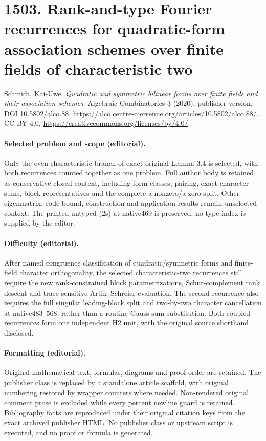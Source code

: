 \documentclass[10pt]{article}
\theoremstyle{definition}
\begin{document}
\section*{1503. Rank-and-type Fourier recurrences for quadratic-form association schemes over finite fields of characteristic two}
Schmidt, Kai-Uwe. \emph{Quadratic and symmetric bilinear forms over finite fields and their association schemes}. Algebraic Combinatorics 3 (2020), publisher version, DOI 10.5802/alco.88. \url{https://alco.centre-mersenne.org/articles/10.5802/alco.88/}. CC BY 4.0, \url{https://creativecommons.org/licenses/by/4.0/}.
\paragraph{Selected problem and scope (editorial).} Only the even-characteristic branch of exact original Lemma 3.4 is selected, with both recurrences counted together as one problem. Full author body is retained as conservative closed context, including form classes, pairing, exact character sums, block representatives and the complete a-nonzero/a-zero split. Other eigenmatrix, code bound, construction and application results remain unselected context. The printed untyped (2s) at native469 is preserved; no type index is supplied by the editor.
\paragraph{Difficulty (editorial).} After named congruence classification of quadratic/symmetric forms and finite-field character orthogonality, the selected characteristic-two recurrences still require the new rank-constrained block parametrizations, Schur-complement rank descent and trace-sensitive Artin–Schreier evaluation. The second recurrence also requires the full singular leading-block split and two-by-two character cancellation at native483–568, rather than a routine Gauss-sum substitution. Both coupled recurrences form one independent H2 unit, with the original source shorthand disclosed.
\paragraph{Formatting (editorial).} Original mathematical text, formulas, diagrams and proof order are retained. The publisher class is replaced by a standalone article scaffold, with original numbering restored by wrapper counters where needed. Non-rendered original comment prose is excluded while every percent newline guard is retained. Bibliography facts are reproduced under their original citation keys from the exact archived publisher HTML. No publisher class or upstream script is executed, and no proof or formula is generated.
\end{document}
